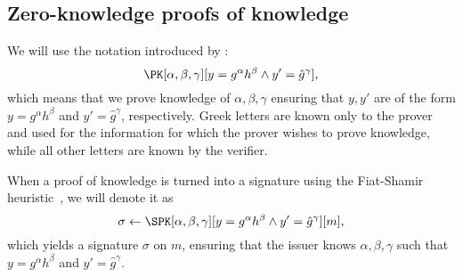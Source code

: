 \subsection{Zero-knowledge proofs of knowledge}%
\label{ZKPK}

We will use the notation introduced by \citet{PKnotation}:
\begin{equation}\label{PKexample}
  \PK[\alpha, \beta, \gamma][y = g^\alpha h^\beta \land y' = \hat g^\gamma],
\end{equation}
which means that we prove knowledge of \(\alpha, \beta, \gamma\) ensuring that \(y, y'\) are of the form \(y = g^\alpha h^\beta\) and \(y' = \hat g^\gamma\), respectively.
Greek letters are known only to the prover and used for the information for which the prover wishes to prove knowledge, while all other letters are known by the verifier.

When a proof of knowledge is turned into a signature using the Fiat-Shamir heuristic~\cite{FiatShamirHeuristic}, we will denote it as
\begin{equation*}\label{SPKexample}
  \sigma\gets \SPK[\alpha, \beta, \gamma]%
  [y = g^\alpha h^\beta \land y' = \hat g^\gamma]%
  [m],
\end{equation*}
which yields a signature \(\sigma\) on \(m\), ensuring that the issuer knows \(\alpha, \beta, \gamma\) such that \(y = g^\alpha h^\beta\) and \(y' = \hat{g}^\gamma\).


